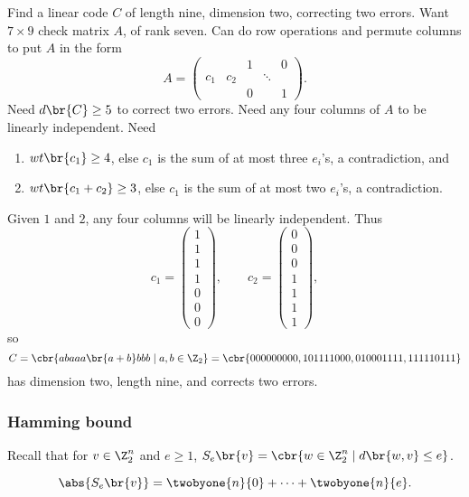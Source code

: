 \begin{example*}
Find a linear code $ C $ of length nine, dimension two, correcting two errors. Want $ 7 \times 9 $ check matrix $ A $, of rank seven. Can do row operations and permute columns to put $ A $ in the form
$$ A =
\begin{pmatrix}
& & 1 & & 0 \\
c_1 & c_2 & & \ddots & \\
& & 0 & & 1
\end{pmatrix}.
$$
Need $ d\br{C} \ge 5 $ to correct two errors. Need any four columns of $ A $ to be linearly independent. Need
\begin{enumerate}
\item $ wt\br{c_1} \ge 4 $, else $ c_1 $ is the sum of at most three $ e_i $'s, a contradiction, and
\item $ wt\br{c_1 + c_2} \ge 3 $, else $ c_1 $ is the sum of at most two $ e_i $'s, a contradiction.
\end{enumerate}
Given $ 1 $ and $ 2 $, any four columns will be linearly independent. Thus
$$ c_1 =
\begin{pmatrix}
1 \\
1 \\
1 \\
1 \\
0 \\
0 \\
0
\end{pmatrix},
\qquad c_2 =
\begin{pmatrix}
0 \\
0 \\
0 \\
1 \\
1 \\
1 \\
1
\end{pmatrix},
$$
so
$$ C = \cbr{abaaa\br{a + b}bbb \mid a, b \in \Z_2} = \cbr{000000000, 101111000, 010001111, 111110111} $$
has dimension two, length nine, and corrects two errors.
\end{example*}

\pagebreak

\subsubsection{Hamming bound}

Recall that for $ v \in \Z_2^n $ and $ e \ge 1 $, $ S_e\br{v} = \cbr{w \in \Z_2^n \mid d\br{w, v} \le e} $.

\begin{proposition}
\label{prop:1.9}
$$ \abs{S_e\br{v}} = \twobyone{n}{0} + \dots + \twobyone{n}{e}. $$
\end{proposition}

